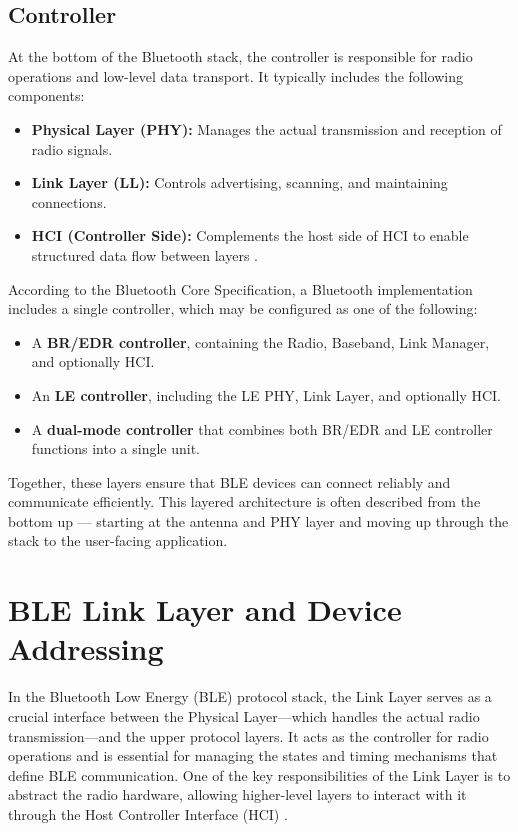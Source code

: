 \subsection{Controller}

At the bottom of the Bluetooth stack, the controller is responsible for radio operations and low-level data transport. It typically includes the following components:

\begin{itemize}
    \item \textbf{Physical Layer (PHY):} Manages the actual transmission and reception of radio signals.
    \item \textbf{Link Layer (LL):} Controls advertising, scanning, and maintaining connections.
    \item \textbf{HCI (Controller Side):} Complements the host side of HCI to enable structured data flow between layers \cite{nextgenBLE}.
\end{itemize}

According to the Bluetooth Core Specification, a Bluetooth implementation includes a single controller, which may be configured as one of the following:

\begin{itemize}
    \item A \textbf{BR/EDR controller}, containing the Radio, Baseband, Link Manager, and optionally HCI.
    \item An \textbf{LE controller}, including the LE PHY, Link Layer, and optionally HCI.
    \item A \textbf{dual-mode controller} that combines both BR/EDR and LE controller functions into a single unit.
\end{itemize}

Together, these layers ensure that BLE devices can connect reliably and communicate efficiently. This layered architecture is often described from the bottom up — starting at the antenna and PHY layer and moving up through the stack to the user-facing application.

\section{BLE Link Layer and Device Addressing}

In the Bluetooth Low Energy (BLE) protocol stack, the Link Layer serves as a crucial interface between the Physical Layer—which handles the actual radio transmission—and the upper protocol layers. It acts as the controller for radio operations and is essential for managing the states and timing mechanisms that define BLE communication. One of the key responsibilities of the Link Layer is to abstract the radio hardware, allowing higher-level layers to interact with it through the Host Controller Interface (HCI) \cite{introtoble}. 


